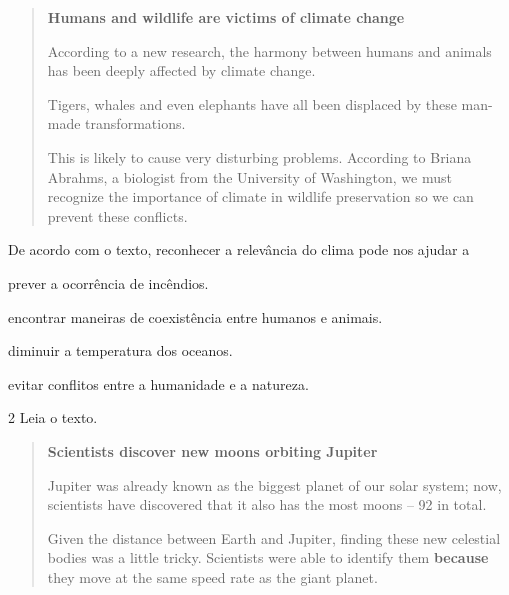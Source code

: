 \begin{quote}
\textbf{Humans and wildlife are victims of climate change}

According to a new research, the harmony between humans and animals has been deeply affected by climate change.

Tigers, whales and even elephants have all been displaced by these man-made transformations.

This is likely to cause very disturbing problems. According to Briana Abrahms, a biologist from the University of Washington, we must recognize the importance of climate in wildlife preservation so we can prevent these conflicts.  

\end{quote}


De acordo com o texto, reconhecer a relevância do clima pode nos ajudar a

\begin{escolha}
\item prever a ocorrência de incêndios.

\item encontrar maneiras de coexistência entre humanos e animais.

\item diminuir a temperatura dos oceanos.

\item evitar conflitos entre a humanidade e a natureza.
\end{escolha}

\num{2} Leia o texto.

\begin{quote}
\textbf{Scientists discover new moons orbiting Jupiter}

Jupiter was already known as the biggest planet of our solar system; now, scientists have discovered that it also has the most moons – 92 in total.

Given the distance between Earth and Jupiter, finding these new celestial bodies was a little tricky. Scientists were able to identify them \textbf{because} they move at the same speed rate as the giant planet.

\end{quote}

